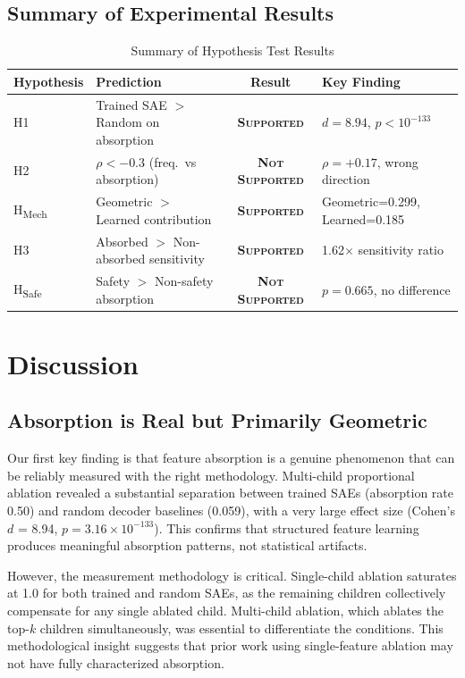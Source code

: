 \documentclass{article}
\begin{document}
\subsection{Summary of Experimental Results}

\begin{table}[t]
\caption{Summary of Hypothesis Test Results}
\label{tab:summary}
\centering
\begin{tabular}{@{}llcp{2.8cm}@{}}
\toprule
Hypothesis & Prediction & Result & Key Finding \\
\midrule
H1 & Trained SAE $>$ Random on absorption & \textbf{\textsc{Supported}} & $d=8.94$, $p < 10^{-133}$ \\
H2 & $\rho < -0.3$ (freq.\ vs absorption) & \textbf{\textsc{Not Supported}} & $\rho = +0.17$, wrong direction \\
H\textsubscript{Mech} & Geometric $>$ Learned contribution & \textbf{\textsc{Supported}} & Geometric=0.299, Learned=0.185 \\
H3 & Absorbed $>$ Non-absorbed sensitivity & \textbf{\textsc{Supported}} & 1.62$\times$ sensitivity ratio \\
H\textsubscript{Safe} & Safety $>$ Non-safety absorption & \textbf{\textsc{Not Supported}} & $p = 0.665$, no difference \\
\bottomrule
\end{tabular}
\end{table}

\section{Discussion}

\subsection{Absorption is Real but Primarily Geometric}

Our first key finding is that feature absorption is a genuine phenomenon that can be reliably measured with the right methodology. Multi-child proportional ablation revealed a substantial separation between trained SAEs (absorption rate 0.50) and random decoder baselines (0.059), with a very large effect size (Cohen's $d$ = 8.94, $p = 3.16 \times 10^{-133}$). This confirms that structured feature learning produces meaningful absorption patterns, not statistical artifacts.

However, the measurement methodology is critical. Single-child ablation saturates at 1.0 for both trained and random SAEs, as the remaining children collectively compensate for any single ablated child. Multi-child ablation, which ablates the top-$k$ children simultaneously, was essential to differentiate the conditions. This methodological insight suggests that prior work using single-feature ablation may not have fully characterized absorption.
\end{document}
